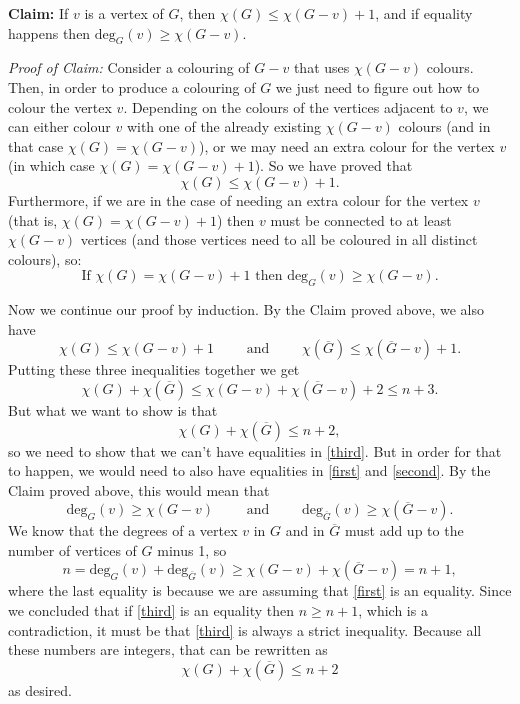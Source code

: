 \documentclass[10pt,landscape]{article}
\renewcommand{\leq}{\leqslant}
\renewcommand{\geq}{\geqslant}
\begin{document}
\begin{multicols}{2}
\vspace{0.5cm}

\noindent \textbf{Claim:} If $v$ is a vertex of $G$, then $\chi(G)\leq\chi(G-v)+1$, and if equality happens then $\text{deg}_G(v)\geq \chi(G-v)$. 

\noindent \emph{Proof of Claim:}
Consider a colouring of $G-v$ that uses $\chi(G-v)$ colours. Then, in order to produce a colouring of $G$ we just need to figure out how to colour the vertex $v$. Depending on the colours of the vertices adjacent to $v$, we can either colour $v$ with one of the already existing $\chi(G-v)$ colours (and in that case $\chi(G)=\chi(G-v)$), or we may need an extra colour for the vertex $v$ (in which case $\chi(G)=\chi(G-v)+1$). So we have proved that\\
$$\chi(G)\leq\chi(G-v)+1.$$
Furthermore, if we are in the case of needing an extra colour for the vertex $v$ (that is, $\chi(G)=\chi(G-v)+1$) then $v$ must be connected to at least $\chi(G-v)$ vertices (and those vertices need to all be coloured in all distinct colours), so:\\
$$\text{If } \chi(G)=\chi(G-v)+1 \text{ then }\text{deg}_G(v)\geq \chi(G-v).$$

\vspace{0.5cm}

Now we continue our proof by induction. By the Claim proved above, we also have\\
\begin{equation}\label{second}
\chi(G)\leq\chi(G-v)+1\qquad \mbox{ and } \qquad \chi(\overline G)\leq\chi(\overline G-v)+1.
\end{equation}
Putting these three inequalities together we get\\
\begin{equation}\label{third}
\chi(G)+\chi(\overline G)\leq \chi(G-v)+\chi(\overline G-v)+2\leq n+3.
\end{equation}
But what we want to show is that \\
$$\chi(G)+\chi(\overline G)\leq n+2,$$
so we need to show that we can't have equalities in \eqref{third}. But in order for that to happen, we would need to also have equalities in \eqref{first} and \eqref{second}. By the Claim proved above, this would mean that \\
$$\text{deg}_G(v)\geq \chi(G-v) \qquad \mbox{ and } \qquad \text{deg}_{\overline G}(v)\geq \chi(\overline G-v).$$
We know that the degrees of a vertex $v$ in $G$ and in $\overline G$ must add up to the number of vertices of $G$ minus 1, so\\
$$n=\text{deg}_G(v)+\text{deg}_{\overline G}(v)\geq \chi(G-v) + \chi(\overline G-v)=n+1, $$
where the last equality is because we are assuming that \eqref{first} is an equality.
Since we concluded that if \eqref{third} is an equality then $n\geq n+1$, which is a contradiction, it must be that \eqref{third} is always a strict inequality. Because all these numbers are integers, that can be rewritten as\\
$$\chi(G)+\chi(\overline G)\leq n+2$$
as desired.\\


\end{multicols}
\end{document}
